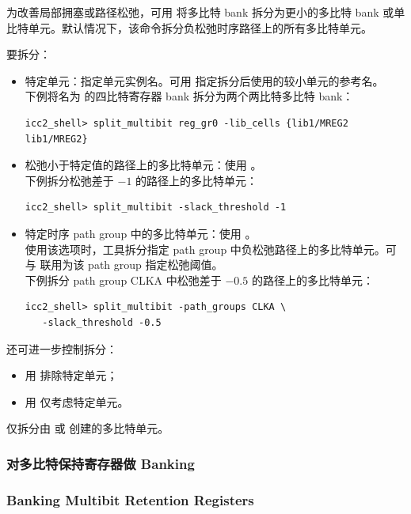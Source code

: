 为改善局部拥塞或路径松弛，可用  将多比特 bank 拆分为更小的多比特 bank 或单比特单元。默认情况下，该命令拆分负松弛时序路径上的所有多比特单元。

要拆分：
\begin{itemize}
  \item 特定单元：指定单元实例名。可用  指定拆分后使用的较小单元的参考名。\\
        下例将名为  的四比特寄存器 bank 拆分为两个两比特多比特 bank：
\begin{lstlisting}
icc2_shell> split_multibit reg_gr0 -lib_cells {lib1/MREG2 lib1/MREG2}
\end{lstlisting}
  \item 松弛小于特定值的路径上的多比特单元：使用 。\\
        下例拆分松弛差于 $-1$ 的路径上的多比特单元：
\begin{lstlisting}
icc2_shell> split_multibit -slack_threshold -1
\end{lstlisting}
  \item 特定时序 path group 中的多比特单元：使用 。\\
        使用该选项时，工具拆分指定 path group 中负松弛路径上的多比特单元。可与  联用为该 path group 指定松弛阈值。\\
        下例拆分 path group CLKA 中松弛差于 $-0.5$ 的路径上的多比特单元：
\begin{lstlisting}
icc2_shell> split_multibit -path_groups CLKA \
   -slack_threshold -0.5
\end{lstlisting}
\end{itemize}

还可进一步控制拆分：
\begin{itemize}
  \item 用  排除特定单元；
  \item 用  仅考虑特定单元。
\end{itemize}

 仅拆分由  或  创建的多比特单元。

\subsubsection{对多比特保持寄存器做 Banking}
\subsubsection*{Banking Multibit Retention Registers}

